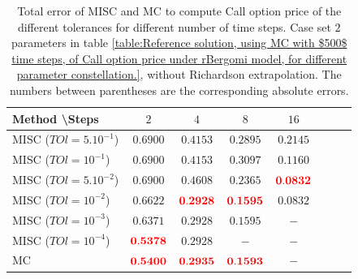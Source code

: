 \documentclass[11pt]{article}
\begin{document}
\FloatBarrier
\begin{table}[h!]
	\centering
	\begin{tabular}{l*{6}{c}r}
		Method \textbackslash  Steps            & $2$ & $4$ & $8$ & $16$  \\
		\hline
		MISC ($TOl=5.10^{-1}$)  & $\mathbf{
			0.6900}$ & $\mathbf{   
			0.4153
		}$ & $\mathbf{    0.2895}$ & $\mathbf{     0.2145}$  \\
		MISC ($TOl=10^{-1}$)  & $\mathbf{
			0.6900}$& $\mathbf{    
		0.4153}$ & $\mathbf{     
		0.3097
		}$ & $\mathbf{
		0.1160}$  \\
		MISC ($TOl=5.10^{-2}$)  &$\mathbf{
			0.6900}$ & $\mathbf{         0.4608
	}$ & $\mathbf{      
	0.2365
}$ & $\mathbf{ {\color{red}
		0.0832}}$  \\
		MISC ($TOl=10^{-2}$)  & $\mathbf{ 
			0.6622}$ & $\mathbf{  {\color{red} 
				0.2928
			}
		}$ & $\mathbf{ {\color{red}    0.1595}}$ & $\mathbf{ 
		0.0832}$  \\
		MISC ($TOl=10^{-3}$)        & $\mathbf{
			0.6371}$  &  $\mathbf{
		0.2928
	}$ &  $\mathbf{    0.1595}$ &  $-$ \\
		MISC ($TOl=10^{-4}$)        & $\mathbf{       {\color{red}0.5378}}$  & $\mathbf{
			0.2928
		}$  &  $-$ &  $-$ \\
		\hline
		MC    & $\mathbf{{\color{red}    0.5400}}$  & $\mathbf{{\color{red}0.2935}
		}$  &$\mathbf{{\color{red}
			0.1593}}$  & $\mathbf{-}$  \\	
	
		\hline
	\end{tabular}
	\caption{Total error of MISC and MC to compute Call option price of the different tolerances for different number of time steps. Case  set $2$ parameters in table \ref{table:Reference solution, using MC with $500$ time steps, of Call option price under rBergomi model, for different parameter constellation.}, without Richardson extrapolation. The numbers between parentheses are the corresponding absolute errors.}
	\label{Total error of MISC and MC to compute Call option price of the different tolerances for different number of time steps. Case $K=1$, $H=0.07$, without Richardson extrapolation. The numbers between parentheses are the corresponding absolute errors,linear}
\end{table}
\end{document}
